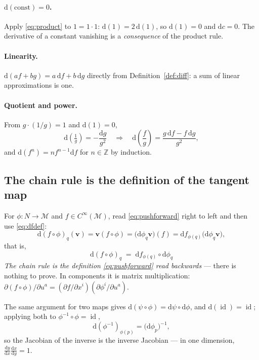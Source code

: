 \documentclass[10pt,a4paper]{article}
\newcommand{\dd}{\mathrm{d}}
\newcommand{\Z}{\mathbb{Z}}
\newcommand{\M}{\mathcal{M}}
\newcommand{\vv}{\mathbf{v}}
\DeclareMathOperator{\id}{id}
\theoremstyle{plain}
\theoremstyle{definition}
\numberwithin{equation}{section}
\begin{document}
\paragraph{$\dd(\text{const})=0$.} Apply \eqref{eq:product} to $1=1\cdot1$:
$\dd(1)=2\,\dd(1)$, so $\dd(1)=0$ and $\dd c=0$. The derivative of a constant vanishing is a
\emph{consequence} of the product rule.

\paragraph{Linearity.} $\dd(af+bg)=a\,\dd f+b\,\dd g$ directly from Definition~\ref{def:diff}:
a sum of linear approximations is one.

\paragraph{Quotient and power.} From $g\cdot(1/g)=1$ and $\dd(1)=0$,
\begin{equation}
\dd\!\left(\tfrac1g\right)=-\frac{\dd g}{g^2}
\quad\Longrightarrow\quad
\dd\!\left(\frac fg\right)=\frac{g\,\dd f-f\,\dd g}{g^2},
\end{equation}
and $\dd(f^n)=nf^{n-1}\dd f$ for $n\in\Z$ by induction.

\subsection{The chain rule is the definition of the tangent map}
\label{sec:chainrule}

For $\phi:N\to\M$ and $f\in C^\infty(\M)$, read \eqref{eq:pushforward} right to left and then
use \eqref{eq:dfdef}:
\begin{equation}
\dd(f\circ\phi)_q(\vv)=\vv(f\circ\phi)=\big(\dd\phi_q\vv\big)(f)=\dd f_{\phi(q)}\big(\dd\phi_q\vv\big),
\end{equation}
that is,
\begin{equation}
\boxed{\ \dd(f\circ\phi)_q\;=\;\dd f_{\phi(q)}\circ\dd\phi_q\ }
\label{eq:chainrule}
\end{equation}
\emph{The chain rule is the definition \eqref{eq:pushforward} read backwards} --- there is
nothing to prove. In components it is matrix multiplication:
$\partial(f\circ\phi)/\partial u^a=(\partial f/\partial x^i)(\partial\phi^i/\partial u^a)$.

The same argument for two maps gives $\dd(\psi\circ\phi)=\dd\psi\circ\dd\phi$, and
$\dd(\id)=\id$; applying both to $\phi^{-1}\circ\phi=\id$,
\begin{equation}
\dd(\phi^{-1})_{\phi(p)}=\big(\dd\phi_p\big)^{-1},
\label{eq:invfn}
\end{equation}
so the Jacobian of the inverse is the inverse Jacobian --- in one dimension,
$\frac{\dd y}{\dd x}\frac{\dd x}{\dd y}=1$.
\end{document}
